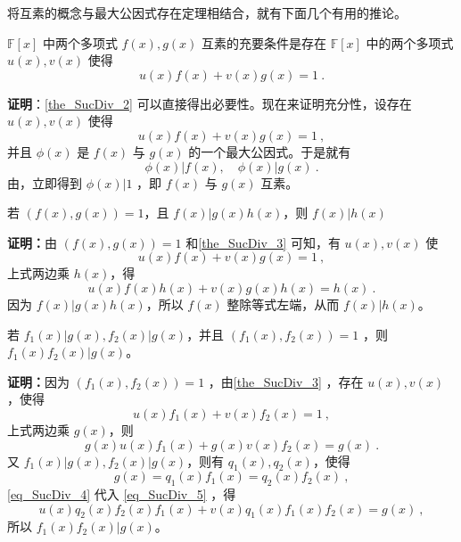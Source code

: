将互素的概念与最大公因式存在定理相结合，就有下面几个有用的推论。
\begin{theorem}{}\label{the_SucDiv_3}
$\mathbb{F}[x]$ 中两个多项式 $f(x),g(x)$ 互素的充要条件是存在 $\mathbb{F}[x]$ 中的两个多项式 $u(x),v(x)$ 使得
\begin{equation}
u(x)f(x)+v(x)g(x)=1~.
\end{equation}
\end{theorem}
\textbf{证明}：\autoref{the_SucDiv_2} 可以直接得出必要性。现在来证明充分性，设存在 $u(x),v(x)$ 使得 
\begin{equation}
u(x)f(x)+v(x)g(x)=1~,
\end{equation}
并且 $\phi(x)$ 是 $f(x)$ 与 $g(x)$ 的一个最大公因式。于是就有
\begin{equation}
\phi(x)|f(x),\quad \phi(x)|g(x)~.
\end{equation}
由，立即得到 $\phi(x)|1$ ，即 $f(x)$ 与 $g(x)$ 互素。
\begin{theorem}{}\label{the_SucDiv_4}
若 $(f(x),g(x))=1$，且 $f(x)|g(x)h(x)$，则 $f(x)|h(x)$
\end{theorem}
\textbf{证明：}由 $(f(x),g(x))=1$ 和\autoref{the_SucDiv_3} 可知，有 $u(x),v(x)$ 使
\begin{equation}
u(x)f(x)+v(x)g(x)=1~,
\end{equation}
上式两边乘 $h(x)$，得
\begin{equation}
u(x)f(x)h(x)+v(x)g(x)h(x)=h(x)~.
\end{equation}
因为 $f(x)|g(x)h(x)$，所以 $f(x)$ 整除等式左端，从而 $f(x)|h(x)$。
\begin{theorem}{}
若 $f_1(x)|g(x),f_2(x)|g(x)$，并且 $(f_1(x),f_2(x))=1$ ，则 $f_1(x)f_2(x)|g(x)$。
\end{theorem}
\textbf{证明：}因为 $(f_1(x),f_2(x))=1$ ，由\autoref{the_SucDiv_3} ，存在 $u(x),v(x)$ ，使得
\begin{equation}
u(x)f_1(x)+v(x)f_2(x)=1~,
\end{equation}
上式两边乘 $g(x)$，则
\begin{equation}\label{eq_SucDiv_5}
g(x)u(x)f_1(x)+g(x)v(x)f_2(x)=g(x)~.
\end{equation}
又 $f_1(x)|g(x),f_2(x)|g(x)$，则有 $q_1(x),q_2(x)$，使得
\begin{equation}\label{eq_SucDiv_4}
g(x)=q_1(x)f_1(x)=q_2(x)f_2(x)~,
\end{equation}
\autoref{eq_SucDiv_4} 代入 \autoref{eq_SucDiv_5} ，得
\begin{equation}
u(x)q_2(x)f_2(x)f_1(x)+v(x)q_1(x)f_1(x)f_2(x)=g(x)~,
\end{equation}
所以 $f_1(x)f_2(x)|g(x)$。
